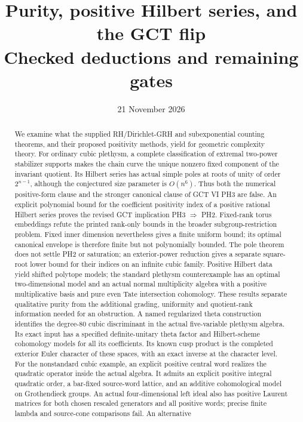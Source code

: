\documentclass[11pt,a4paper]{article}
\title{Purity, positive Hilbert series, and the GCT flip\\[5pt]\large Checked deductions and remaining gates}
\author{}
\date{21 November 2026}
\begin{document}
\maketitle
\begin{abstract}
We examine what the supplied RH/Dirichlet-GRH and subexponential counting
theorems, and their proposed positivity methods, yield for geometric
complexity theory. For ordinary cubic plethysm, a complete classification
of extremal two-power stabilizer supports makes the chain curve the unique
nonzero fixed component of the invariant quotient. Its Hilbert series
has actual simple poles at roots of unity of order $2^{n-1}$,
although the conjectured size
parameter is $O(n^6)$. Thus both the numerical positive-form clause and
the stronger canonical clause of GCT VI PH3 are false. An explicit
polynomial bound for the coefficient
positivity index of a positive rational Hilbert series proves the revised
GCT implication PH3 $\Rightarrow$ PH2. Fixed-rank torus embeddings refute
the printed rank-only bounds in the broader subgroup-restriction problem.
Fixed inner dimension nevertheless gives a finite uniform bound; its
optimal canonical envelope is therefore finite but not polynomially
bounded. The pole theorem does not settle PH2 or saturation; an
exterior-power reduction gives a separate square-root lower bound for
their indices on an infinite cubic family. Positive Hilbert data yield shifted polytope models; the
standard plethysm counterexample has an optimal two-dimensional model
and an actual normal multiplicity algebra with a positive multiplicative
basis and pure even Tate intersection cohomology. These results separate qualitative purity
from the additional grading, uniformity and quotient-rank information
needed for an obstruction. A named regularized theta construction
identifies the degree-$80$ cubic discriminant in the actual five-variable
plethysm algebra. Its exact input has a specified definite-unitary theta
factor and Hilbert-scheme cohomology models for all its coefficients.
Its known cusp product is the completed exterior Euler character of
these spaces, with an exact inverse at the character level.
For the nonstandard cubic example, an explicit positive central word
realizes the quadratic operator inside the actual algebra. It admits
an explicit positive integral quadratic order, a bar-fixed source-word
lattice, and an additive cohomological model on Grothendieck groups.
An actual four-dimensional left ideal also has positive Laurent
matrices for both chosen rescaled generators and all positive words;
precise finite lambda and source-cone comparisons fail. An alternative

\end{abstract}
\end{document}
